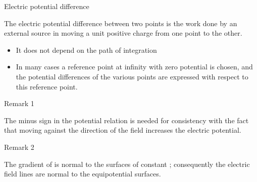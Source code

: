 \begin{ELdefinition}{Electric potential difference}

The electric potential difference between two points is the work done by an external source in moving a unit positive charge from one point to the other.

\begin{itemize}
\tightlist
\item
  It does not depend on the path of integration
\end{itemize}

\end{ELdefinition}

\begin{ELjoin}

\begin{itemize}
\tightlist
\item
  In many cases a reference point at infinity with zero potential is chosen, and the potential differences of the various points are expressed with respect to this reference point.
\end{itemize}

\begin{ELimportant}{}


\end{ELimportant}

\end{ELjoin}

\begin{ELremark}{Remark 1}

The minus sign in the potential relation is needed for consistency with the fact that moving against the direction of the field increases the electric potential.

\end{ELremark}

\begin{ELremark}{Remark 2}

The gradient of  is normal to the surfaces of constant ; consequently the electric field lines are normal to the equipotential surfaces.

\end{ELremark}


